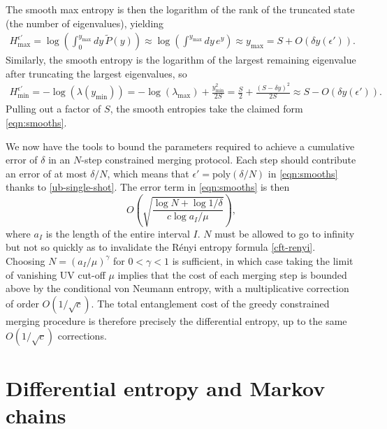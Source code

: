 \documentclass[12pt]{article}
\newcommand{\beq}{\begin{eqnarray}}
\newcommand{\eeq}{\end{eqnarray}}
\newcommand{\Hmax}{H_{\max}}
\newcommand{\Hmin}{H_{\min}}
\newcommand{\lamm}{\lambda_{\max}}
\begin{document}
The smooth max entropy is then the logarithm of the rank of the truncated state (the number of eigenvalues), yielding
\beq
\Hmax^{\epsilon'} = \log\left(\int_0^{y_{\max}} dy\, \tilde{P}(y)\right) \approx \log\left(\int^{y_{\max}} dy\, e^y \right) \approx y_{\max} = S + O(\delta y(\epsilon')).
\eeq
Similarly, the smooth entropy is the logarithm of the largest remaining eigenvalue after truncating the largest eigenvalues, so
\beq
\Hmin^{\epsilon'} = -\log(\lambda(y_{\min})) = - \log(\lamm) + \frac{y_{\min}^2}{2S} = \frac{S}{2} + \frac{(S - \delta y)^2}{2 S} \approx S - O(\delta y(\epsilon')).
\eeq
Pulling out a factor of $S$, the smooth entropies take the claimed form \eqref{eqn:smooths}.

We now have the tools to bound the parameters required to achieve a cumulative error of $\delta$ in an $N$-step constrained merging protocol. Each step should contribute an error of at most $\delta/N$, which means that $\epsilon' = \text{poly}(\delta/N)$ in \eqref{eqn:smooths} thanks to \eqref{ub-single-shot}. The error term in \eqref{eqn:smooths} is then
\begin{equation}
O\left( \sqrt{ \frac{\log N + \log 1/\delta}{c \log a_I/\mu} } \right),
\end{equation}
where $a_I$ is the length of the entire interval $I$. $N$ must be allowed to go to infinity but not so quickly as to invalidate the R\'enyi entropy formula \eqref{cft-renyi}. Choosing $N=(a_I/\mu)^\gamma$ for $0 < \gamma < 1$ is sufficient, in which case taking the limit of vanishing UV cut-off $\mu$ implies that the cost of each merging step is bounded above by the conditional von Neumann entropy, with a multiplicative correction of order $O(1/\sqrt{c})$. The total entanglement cost of the greedy constrained merging procedure is therefore precisely the differential entropy, up to the same $O(1/\sqrt{c})$ corrections.


\section{Differential entropy and Markov chains}
\label{secmarkov}
\end{document}
